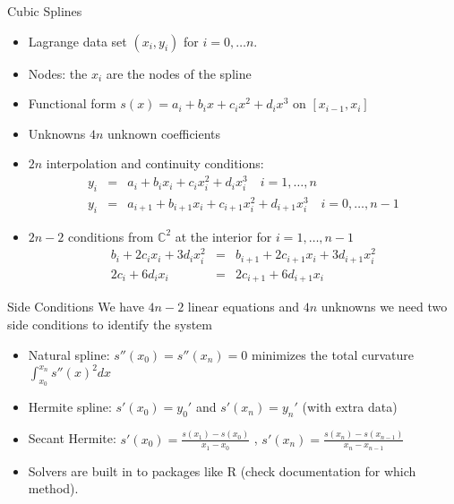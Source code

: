 \documentclass[11pt,handout,xcolor=pdftex,dvipsnames,table,mathserif,aspectratio=169]{beamer}
\begin{document}
\begin{frame}{Cubic Splines}
\small
\begin{itemize}
\item Lagrange data set $(x_i,y_i)$ for $i=0,\ldots n$.
\item Nodes: the $x_i$ are the nodes of the spline
\item Functional form $s(x) = a_i + b_i x + c_i x^2 + d_i x^3$ on $[x_{i-1},x_i]$
\item Unknowns $4n$ unknown coefficients
\item $2n$ interpolation and continuity conditions:
\begin{eqnarray*}
y_i &=& a_i + b_i x_i + c_i x_i^2 + d_i x_i^3 \quad i=1,\dots, n\\
y_i &=& a_{i+1} + b_{i+1} x_i + c_{i+1} x_i^2 + d_{i+1} x_i^3 \quad i=0,\ldots, n-1
\end{eqnarray*}
\item $2n - 2$ conditions from $\mathbb{C}^2$ at the interior for $i=1,\ldots,n-1$
\begin{eqnarray*}
b_i + 2c_i x_i + 3 d_i x_i^2  &=& b_{i+1} + 2 c_{i+1} x_i + 3 d_{i+1}x_i^2\\ 
2c_i + 6d_i x_i &=& 2c_{i+1} + 6d_{i+1} x_i
\end{eqnarray*}
\end{itemize}
\end{frame}


\begin{frame}{Side Conditions}
We have $4n-2$ linear equations and $4n$ unknowns we need two side conditions to identify the system
\begin{itemize}
\item Natural spline: $s''(x_0) = s''(x_n) = 0$ minimizes the total curvature $\int_{x_0}^{x_n} s''(x)^2 dx$
\item Hermite spline: $s'(x_0) = y_0'$ and $s'(x_n) = y_n'$ (with extra data)
\item Secant Hermite: $s'(x_0) = \frac{s(x_1) - s(x_0)}{x_1-x_0}$ , $s'(x_n) = \frac{s(x_n) - s(x_{n-1})}{x_n-x_{n-1}}$
\item Solvers are built in to packages like R (check documentation for which method).
\end{itemize}
\end{frame}
\end{document}
